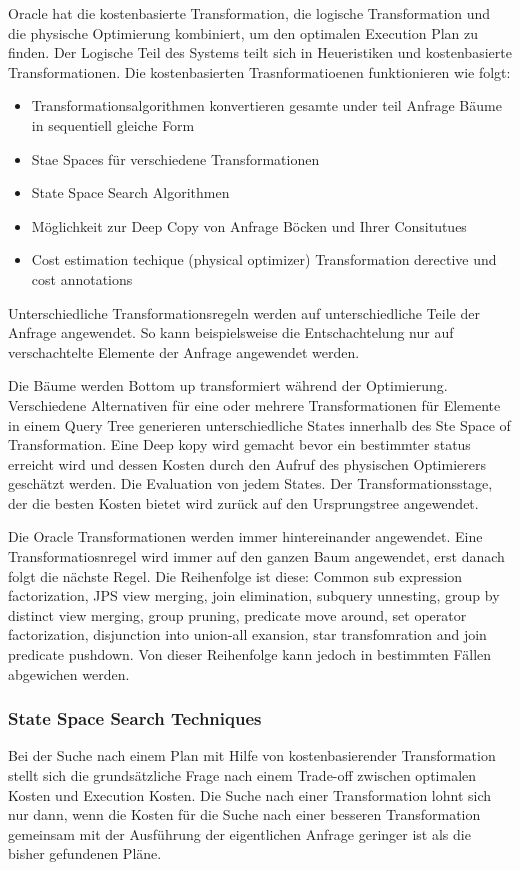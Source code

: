 Oracle hat die kostenbasierte Transformation, die logische Transformation und die physische Optimierung kombiniert, um den optimalen Execution Plan zu finden. Der Logische Teil des Systems teilt sich in Heueristiken und kostenbasierte Transformationen. Die kostenbasierten Trasnformatioenen funktionieren wie folgt:

\begin{itemize}
\item Transformationsalgorithmen konvertieren gesamte under teil Anfrage Bäume in sequentiell gleiche Form
\item Stae Spaces für verschiedene Transformationen
\item State Space Search Algorithmen
\item Möglichkeit zur Deep Copy von Anfrage Böcken und Ihrer Consitutues
\item Cost estimation techique (physical optimizer)
Transformation derective und cost annotations
\end{itemize}

Unterschiedliche Transformationsregeln werden auf unterschiedliche Teile der Anfrage angewendet. So kann beispielsweise die Entschachtelung nur auf verschachtelte Elemente der Anfrage angewendet werden. 

Die Bäume werden Bottom up transformiert während der Optimierung. Verschiedene Alternativen für eine oder mehrere Transformationen für Elemente in einem Query Tree generieren unterschiedliche States innerhalb des Ste Space of Transformation. Eine Deep kopy wird gemacht bevor ein bestimmter status erreicht wird und dessen Kosten durch den Aufruf des physischen Optimierers geschätzt werden. Die Evaluation von jedem States. Der Transformationsstage, der die besten Kosten bietet wird zurück auf den Ursprungstree angewendet.

Die Oracle Transformationen werden immer hintereinander angewendet. Eine Transformatiosnregel wird immer auf den ganzen Baum angewendet, erst danach folgt die nächste Regel. Die Reihenfolge ist diese: Common sub expression factorization, JPS view merging, join elimination, subquery unnesting, group by distinct view merging, group pruning, predicate move around, set operator factorization, disjunction into union-all exansion, star transfomration and join predicate pushdown. Von dieser Reihenfolge kann jedoch in bestimmten Fällen abgewichen werden. 



\subsubsection{State Space Search Techniques}
Bei der Suche nach einem Plan mit Hilfe von kostenbasierender Transformation stellt sich die grundsätzliche Frage nach einem Trade-off zwischen optimalen Kosten und Execution Kosten. Die Suche nach einer Transformation lohnt sich nur dann, wenn die Kosten für die Suche nach einer besseren Transformation gemeinsam mit der Ausführung der eigentlichen Anfrage geringer ist als die bisher gefundenen Pläne.

